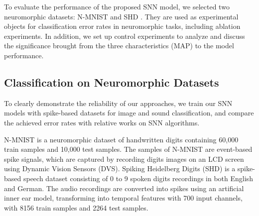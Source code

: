 \documentclass{article}
\begin{document}
To evaluate the performance of the proposed SNN model, we selected two neuromorphic datasets: N-MNIST \cite{orchard_converting_2015} and SHD \cite{cramer_heidelberg_2020}. They are used as experimental objects for classification error rates in neuromorphic tasks, including ablation experiments. In addition, we set up control experiments to analyze and discuss the significance brought from the three characteristics (MAP) to the model performance. 



\subsection{Classification on Neuromorphic Datasets}
To clearly demonstrate the reliability of our approaches, we train our SNN models with spike-based datasets for image and sound classification, and compare the achieved error rates with relative works on SNN algorithms.

N-MNIST is a neuromorphic dataset of handwritten digits containing 60,000 train samples and 10,000 test samples. The samples of N-MNIST are event-based spike signals, which are captured by recording digits images on an LCD screen using Dynamic Vision Sensors (DVS). 
Spiking Heidelberg Digits (SHD) is a spike-based speech dataset consisting of 0 to 9 spoken digits recordings in both English and German. The audio recordings are converted into spikes using an artiﬁcial inner ear model, transforming into temporal features with 700 input channels, with 8156 train samples and 2264 test samples.

\begin{table}
\centering
{}
\caption{Performance of different algorithms on N-MNIST.}
\label{tab:N-MNIST results}
\end{table}
\end{document}
